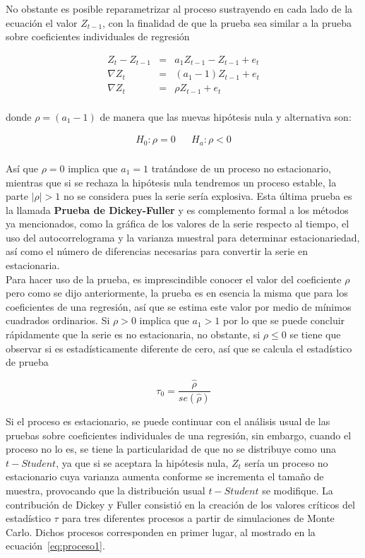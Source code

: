 No obstante es posible reparametrizar al proceso sustrayendo en cada lado de la ecuación el valor $Z_{t-1}$, con la finalidad de que la prueba sea similar a la prueba sobre coeficientes individuales de regresión


 \begin{eqnarray}\label{eq:proceso1}
 Z_t-Z_{t-1} &  =& a_1Z_{t-1}-Z_{t-1}+e_t\nonumber  \\ 
       \nabla Z_t &= & (a_1-1)Z_{t-1}+e_t   \\
         \nabla Z_t & =& \rho Z_{t-1}+e_t  \nonumber \\
 & &  \nonumber 
\end{eqnarray}

donde $\rho=(a_1-1)$ de manera que las nuevas hipótesis nula y alternativa son:

   \begin{eqnarray}
    H_0: \rho=0 &  &  H_a: \rho  < 0   \\ 
    \nonumber 
   \end{eqnarray} 


 Así que $\rho=0$ implica que $a_1=1$ tratándose de un proceso no estacionario, mientras que si se rechaza la hipótesis nula tendremos un proceso estable, la parte $\left | \rho \right |>1$ no se considera pues la serie sería explosiva. Esta última prueba es la llamada \textbf{Prueba de Dickey-Fuller} y es complemento formal a los m\'etodos ya mencionados, como la gráfica de los valores de la serie respecto al tiempo, el uso del autocorrelograma y la varianza muestral para determinar estacionariedad, así como el número de diferencias necesarias para convertir la serie en estacionaria.\\
 
 Para hacer uso de la prueba, es imprescindible conocer el valor del coeficiente $\rho$ pero como se dijo anteriormente, la prueba es en esencia la misma que para los coeficientes de una regresión, así que se estima este valor por medio de mínimos cuadrados ordinarios. Si $\rho >0$ implica que $a_1>1$ por lo que se puede concluir rápidamente que la serie es no estacionaria, no obstante, si $\rho \leq 0$ se tiene que observar si es estadísticamente diferente de cero, así que se calcula el estadístico de prueba
 
 \begin{equation}
 \tau_0=\frac{\hat{\rho}}{se(\hat{\rho})}
 \end{equation}
 
Si el proceso es estacionario, se puede continuar con el análisis usual de las pruebas sobre coeficientes individuales de una regresión, sin embargo, cuando el proceso no lo es, se tiene la particularidad de que no se distribuye como una $t-Student$, ya que si se aceptara la hipótesis nula, $Z_t$ sería un proceso no estacionario cuya varianza aumenta conforme se incrementa el tamaño de muestra, provocando que la distribución usual $t-Student$ se modifique. La contribución de Dickey y Fuller consistió en la creación de los valores críticos del estadístico $\tau$ para tres diferentes procesos  a partir de simulaciones de Monte Carlo. Dichos procesos corresponden en primer lugar, al mostrado en la ecuación~\ref{eq:proceso1}. \\

